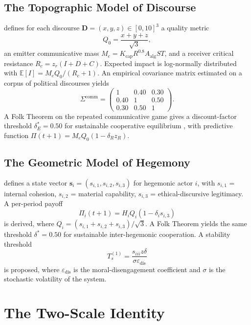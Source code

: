 \documentclass[12pt]{article}
\theoremstyle{plain}
\theoremstyle{definition}
\theoremstyle{remark}
\begin{document}
\subsection{The Topographic Model of Discourse}
\label{sec:topo}

\citet{marcelino2026a} defines for each discourse $\mathbf{D} = (x, y, z) \in [0,10]^3$ a quality metric
\[
Q_0 = \frac{x + y + z}{\sqrt{3}},
\]
an emitter communicative mass $M_e = K_{\text{cap}} R^{0.8} A_{\text{alg}} S T$, and a receiver critical resistance $R_c = z_r(I+D+C)$. Expected impact is log-normally distributed with $\mathbb{E}[I] = M_e Q_0/(R_c+1)$. An empirical covariance matrix estimated on a corpus of political discourses yields
\begin{equation}\label{eq:sigma-comm}
\Sigma^{\text{comm}} = \begin{pmatrix} 1 & 0.40 & 0.30 \\ 0.40 & 1 & 0.50 \\ 0.30 & 0.50 & 1 \end{pmatrix}.
\end{equation}
A Folk Theorem on the repeated communicative game gives a discount-factor threshold $\delta_E^* = 0.50$ for sustainable cooperative equilibrium \citep{fudenberg1986}, with predictive function $\Pi(t+1) = M_e Q_0 (1 - \delta_R z_R)$.

\subsection{The Geometric Model of Hegemony}
\label{sec:geo}

\citet{marcelino2026b} defines a state vector $\mathbf{s}_i = (s_{i,1}, s_{i,2}, s_{i,3})$ for hegemonic actor $i$, with $s_{i,1}$ = internal cohesion, $s_{i,2}$ = material capability, $s_{i,3}$ = ethical-discursive legitimacy. A per-period payoff
\[
\Pi_i(t+1) = H_i Q_i (1 - \delta_i s_{i,3})
\]
is derived, where $Q_i = (s_{i,1}+s_{i,2}+s_{i,3})/\sqrt{3}$. A Folk Theorem yields the same threshold $\delta^* = 0.50$ for sustainable inter-hegemonic cooperation. A stability threshold
\[
T_s^{(1)} = \frac{s_{iii} z \delta}{\sigma \varepsilon_{\text{dis}}}
\]
is proposed, where $\varepsilon_{\text{dis}}$ is the moral-disengagement coefficient \citep{bandura1999} and $\sigma$ is the stochastic volatility of the system.

\section{The Two-Scale Identity}
\label{sec:two-scale}
\end{document}
